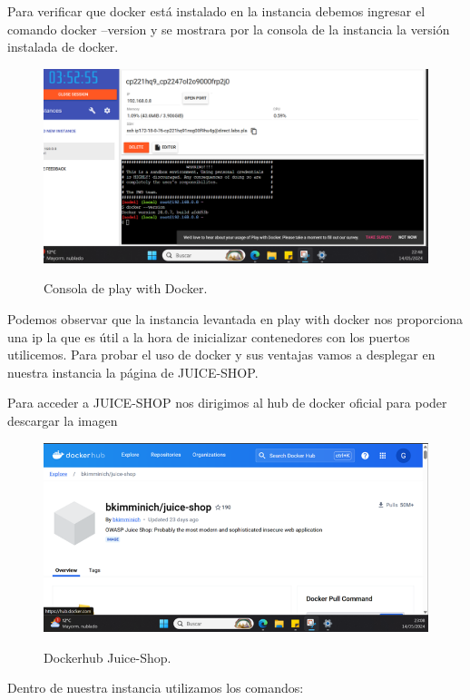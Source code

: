 \documentclass[stu, 11pt, letterpaper, donotrepeattitle, floatsintext, natbib]{apa7}
\begin{document}
Para verificar que docker está instalado en la instancia debemos ingresar el comando docker –version y se mostrara por la consola de la instancia la versión instalada de docker.

\begin{figure}[H]
    \centering
    \caption{Consola de play with Docker.}
    \includegraphics[width=0.75\linewidth]{docker3.png} %
    \label{fig:OverallEffect}
\end{figure}

Podemos observar que la instancia levantada en play with docker nos proporciona una ip la que es útil a la hora de inicializar contenedores con los puertos utilicemos. 
Para probar el uso de docker y sus ventajas vamos a desplegar en nuestra instancia la página de JUICE-SHOP. 

Para acceder a JUICE-SHOP nos dirigimos al hub de docker oficial para poder descargar la imagen

\begin{figure}[H]
    \centering
    \caption{Dockerhub Juice-Shop.}
    \includegraphics[width=0.75\linewidth]{docker4.png} %
    \label{fig:OverallEffect}
\end{figure}

Dentro de nuestra instancia utilizamos los comandos:
\end{document}

